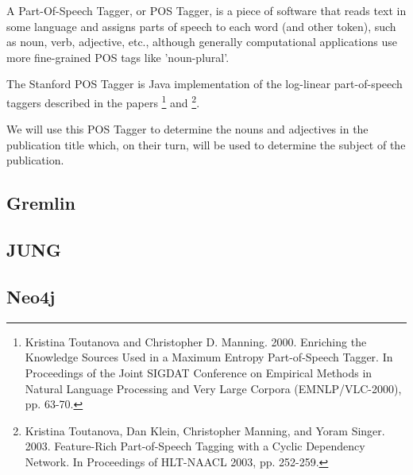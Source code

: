
A Part-Of-Speech Tagger, or POS Tagger, is a piece of software that reads text in some language and assigns parts of speech to each word (and other token), such as noun, verb, adjective, etc., although generally computational applications use more fine-grained POS tags like 'noun-plural'. 

The Stanford POS Tagger is Java implementation of the log-linear part-of-speech taggers described in the papers \footnote{Kristina Toutanova and Christopher D. Manning. 2000. Enriching the Knowledge Sources Used in a Maximum Entropy Part-of-Speech Tagger. In Proceedings of the Joint SIGDAT Conference on Empirical Methods in Natural Language Processing and Very Large Corpora (EMNLP/VLC-2000), pp. 63-70.} and \footnote{Kristina Toutanova, Dan Klein, Christopher Manning, and Yoram Singer. 2003. Feature-Rich Part-of-Speech Tagging with a Cyclic Dependency Network. In Proceedings of HLT-NAACL 2003, pp. 252-259.}.

We will use this POS Tagger to determine the nouns and adjectives in the publication title which, on their turn, will be used to determine the subject of the publication. 

\subsection{Gremlin}

\subsection{JUNG}

\subsection{Neo4j}